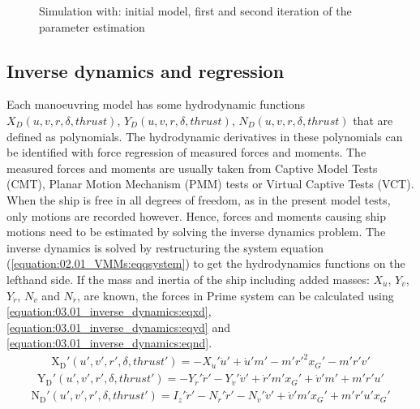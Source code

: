 \documentclass[review]{elsarticle}
\begin{document}
\begin{figure}[H]
\centering
\capstart

\noindent{}
\caption{Simulation with: initial model, first and second iteration of the parameter estimation}\label{\detokenize{01.01_method:iterations}}\end{figure}


\subsection{Inverse dynamics and regression}
\label{\detokenize{03.01_inverse_dynamics:inverse-dynamics-and-regression}}\label{\detokenize{03.01_inverse_dynamics::doc}}
\sphinxAtStartPar
Each manoeuvring model has some hydrodynamic functions \(X_D(u,v,r,\delta,thrust)\), \(Y_D(u,v,r,\delta,thrust)\), \(N_D(u,v,r,\delta,thrust)\) that are defined as polynomials. The hydrodynamic derivatives in these polynomials can be identified with force regression of measured forces and moments. The measured forces and moments are usually taken from Captive Model Tests (CMT), Planar Motion Mechanism (PMM) tests or Virtual Captive Tests (VCT). When the ship is free in all degrees of freedom, as in the present model tests, only
motions are recorded however. Hence, forces and moments causing ship motions need to be estimated by
solving the inverse dynamics problem.
The inverse dynamics is solved by restructuring the system equation (\autoref{equation:02.01_VMMs:eqqsystem}) to get the hydrodynamics functions on the left\sphinxhyphen{}hand side. If the mass and inertia of the ship including added masses: \(X_{\dot{u}}\), \(Y_{\dot{v}}\), \(Y_{\dot{r}}\), \(N_{\dot{v}}\) and \(N_{\dot{r}}\), are known, the forces in Prime system can be calculated using \autoref{equation:03.01_inverse_dynamics:eqxd}, \autoref{equation:03.01_inverse_dynamics:eqyd} and \autoref{equation:03.01_inverse_dynamics:eqnd}.
\begin{equation}\label{equation:03.01_inverse_dynamics:eqxd}
\begin{split}\displaystyle \operatorname{X_{D}'}{\left(u',v',r',\delta,thrust' \right)} = - X_{\dot{u}}' \dot{u}' + \dot{u}' m' - m' r'^{2} x_{G}' - m' r' v'\end{split}
\end{equation}\begin{equation}\label{equation:03.01_inverse_dynamics:eqyd}
\begin{split}\displaystyle \operatorname{Y_{D}'}{\left(u',v',r',\delta,thrust' \right)} = - Y_{\dot{r}}' \dot{r}' - Y_{\dot{v}}' \dot{v}' + \dot{r}' m' x_{G}' + \dot{v}' m' + m' r' u'\end{split}
\end{equation}\begin{equation}\label{equation:03.01_inverse_dynamics:eqnd}
\begin{split}\displaystyle \operatorname{N_{D}'}{\left(u',v',r',\delta,thrust' \right)} = I_{z}' \dot{r}' - N_{\dot{r}}' \dot{r}' - N_{\dot{v}}' \dot{v}' + \dot{v}' m' x_{G}' + m' r' u' x_{G}'\end{split}
\end{equation}
\end{document}
